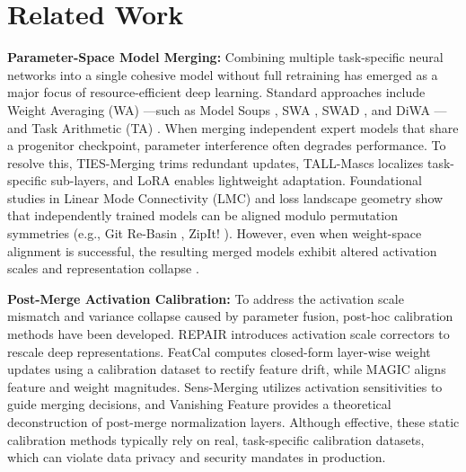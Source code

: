 \documentclass{article}
\theoremstyle{plain}
\theoremstyle{definition}
\theoremstyle{remark}
\begin{document}
\section{Related Work}
\label{sec:related}

\textbf{Parameter-Space Model Merging:} Combining multiple task-specific neural networks into a single cohesive model without full retraining has emerged as a major focus of resource-efficient deep learning. Standard approaches include Weight Averaging (WA) \cite{weight_averaging}—such as Model Soups \cite{weight_averaging}, SWA \cite{swa}, SWAD \cite{swad}, and DiWA \cite{diwa}—and Task Arithmetic (TA) \cite{task_arithmetic}. When merging independent expert models that share a progenitor checkpoint, parameter interference often degrades performance. To resolve this, TIES-Merging \cite{ties} trims redundant updates, TALL-Mascs \cite{tall_mascs} localizes task-specific sub-layers, and LoRA \cite{lora} enables lightweight adaptation. Foundational studies in Linear Mode Connectivity (LMC) \cite{mode_connectivity, lmc_lottery, rebasin_theory} and loss landscape geometry \cite{loss_landscape_viz, flat_optima} show that independently trained models can be aligned modulo permutation symmetries (e.g., Git Re-Basin \cite{git_rebasin}, ZipIt! \cite{zipit}). However, even when weight-space alignment is successful, the resulting merged models exhibit altered activation scales and representation collapse \cite{repair}.

\textbf{Post-Merge Activation Calibration:} To address the activation scale mismatch and variance collapse caused by parameter fusion, post-hoc calibration methods have been developed. REPAIR \cite{repair} introduces activation scale correctors to rescale deep representations. FeatCal \cite{featcal} computes closed-form layer-wise weight updates using a calibration dataset to rectify feature drift, while MAGIC \cite{magic} aligns feature and weight magnitudes. Sens-Merging \cite{sens_merging} utilizes activation sensitivities to guide merging decisions, and Vanishing Feature \cite{vanishing_feature} provides a theoretical deconstruction of post-merge normalization layers. Although effective, these static calibration methods typically rely on real, task-specific calibration datasets, which can violate data privacy and security mandates in production.
\end{document}
